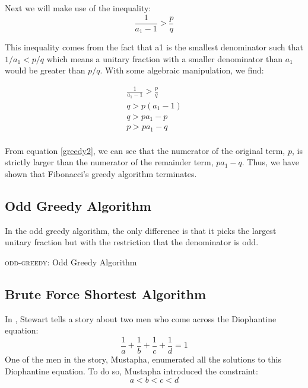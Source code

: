 \documentclass[paper=a4, fontsize=11pt]{scrartcl}
\numberwithin{equation}{section}	 %
\numberwithin{figure}{section}	 %
\numberwithin{table}{section}	 %
\begin{document}
Next we will make use of the inequality:
\begin{equation}
	\frac{1}{a_1 - 1} > \frac{p}{q}
\end{equation}

This inequality comes from the fact that a1 is the smallest denominator such that $1/a_1 < p/q$ which means a unitary fraction with a smaller denominator than $a_1$ would be greater than $p/q$. With some algebraic manipulation, we find:

\begin{equation}\label{greedy2}
\begin{split}
	\frac{1}{a_1 - 1} > \frac{p}{q} \\
	q > p(a_1 - 1) \\
	q > pa_1 - p \\
	p > pa_1 - q \\
\end{split}
\end{equation}

From equation \ref{greedy2}, we can see that the numerator of the original term, $p$, is strictly larger than the numerator of the remainder term, $pa_1 - q$. Thus, we have shown that Fibonacci’s greedy algorithm terminates.

\subsection{Odd Greedy Algorithm}
In the odd greedy algorithm, the only difference is that it picks the largest unitary fraction but with the restriction that the denominator is odd.

\begin{algorithm}[H]
\caption{\textsc{odd-greedy}: Odd Greedy Algorithm}
\label{alg:two}
\end{algorithm}

\subsection{Brute Force Shortest Algorithm}
In \cite{stewart}, Stewart tells a story about two men who come across the Diophantine equation:
\begin{equation}
	\frac{1}{a} + \frac{1}{b} + \frac{1}{c} + \frac{1}{d} = 1
\end{equation}
One of the men in the story, Mustapha, enumerated all the solutions to this Diophantine equation. To do so, Mustapha introduced the constraint:
\begin{equation}\label{brute1}
	a < b < c < d
\end{equation}
\end{document}
